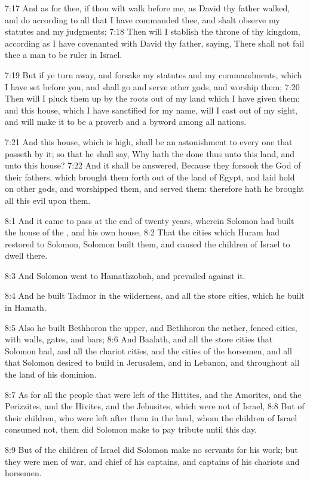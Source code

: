 7:17 And as for thee, if thou wilt walk before me, as David thy father walked, and do according to all that I have commanded thee, and shalt observe my statutes and my judgments; 7:18 Then will I stablish the throne of thy kingdom, according as I have covenanted with David thy father, saying, There shall not fail thee a man to be ruler in Israel.

7:19 But if ye turn away, and forsake my statutes and my commandments, which I have set before you, and shall go and serve other gods, and worship them; 7:20 Then will I pluck them up by the roots out of my land which I have given them; and this house, which I have sanctified for my name, will I cast out of my sight, and will make it to be a proverb and a byword among all nations.

7:21 And this house, which is high, shall be an astonishment to every one that passeth by it; so that he shall say, Why hath the \LORD done thus unto this land, and unto this house?  7:22 And it shall be answered, Because they forsook the \LORD God of their fathers, which brought them forth out of the land of Egypt, and laid hold on other gods, and worshipped them, and served them: therefore hath he brought all this evil upon them.

8:1 And it came to pass at the end of twenty years, wherein Solomon had built the house of the \LORD, and his own house, 8:2 That the cities which Huram had restored to Solomon, Solomon built them, and caused the children of Israel to dwell there.

8:3 And Solomon went to Hamathzobah, and prevailed against it.

8:4 And he built Tadmor in the wilderness, and all the store cities, which he built in Hamath.

8:5 Also he built Bethhoron the upper, and Bethhoron the nether, fenced cities, with walls, gates, and bars; 8:6 And Baalath, and all the store cities that Solomon had, and all the chariot cities, and the cities of the horsemen, and all that Solomon desired to build in Jerusalem, and in Lebanon, and throughout all the land of his dominion.

8:7 As for all the people that were left of the Hittites, and the Amorites, and the Perizzites, and the Hivites, and the Jebusites, which were not of Israel, 8:8 But of their children, who were left after them in the land, whom the children of Israel consumed not, them did Solomon make to pay tribute until this day.

8:9 But of the children of Israel did Solomon make no servants for his work; but they were men of war, and chief of his captains, and captains of his chariots and horsemen.

